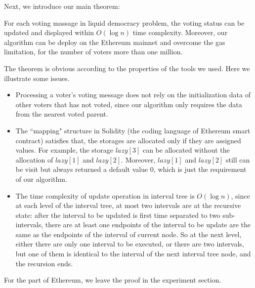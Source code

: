 Next, we introduce our main theorem:
\begin{theorem}
	For each voting massage in liquid democracy problem, the voting status can be updated and displayed within $O(\log n)$ time complexity. Moreover, our algorithm can be deploy on the Ethereum mainnet and overcome the gas limitation, for the number of voters more than one million.
\end{theorem}
The theorem is obvious according to the properties of the tools we used. Here we illustrate some issues.
\begin{itemize}
	\item Processing a voter's voting message does not rely on the initialization data of other voters that has not voted, since our algorithm only requires the data from the nearest voted parent.
	\item The ``mapping" structure in Solidity (the coding language of Ethereum smart contract) satisfies that, the storages are allocated only if they are assigned values. For example, the storage $lazy[3]$ can be allocated without the allocation of $lazy[1]$ and $lazy[2]$. Moreover, $lazy[1]$ and $lazy[2]$ still can be visit but always returned a default value 0, which is just the requirement of our algorithm.
	\item The time complexity of update operation in interval tree is $O(\log n)$, since at each level of the interval tree, at most two intervals are at the recursive state: after the interval to be updated is first time separated to two sub-intervals, there are at least one endpoints of the interval to be update are the same as the endpoints of the interval of current node. So at the next level, either there are only one interval to be executed, or there are two intervals, but one of them is identical to the interval of the next interval tree node, and the recursion ends. 
\end{itemize}
For the part of Ethereum, we leave the proof in the experiment section.